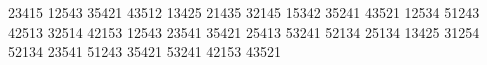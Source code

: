 \documentclass[12pt]{amsart}
\begin{document}
\runType[final]


\begin{answersheetmatter}[final]
\whichCourse[Math. 10260]
\dateOfExam[5/6/2010]

\begin{multiplechoiceStyle}[dotted]%
 23415
 12543
 35421
 43512
 13425
 21435
 32145
 15342
 35241
 43521
 12534
 51243
 42513
 32514
 42153
 12543
 23541
 35421
 25413
 53241
 52134
 25134
 13425
 31254
 52134
 23541
 51243
 35421
 53241
 42153
 43521
\end{multiplechoiceStyle}
\end{answersheetmatter}
\end{document}
